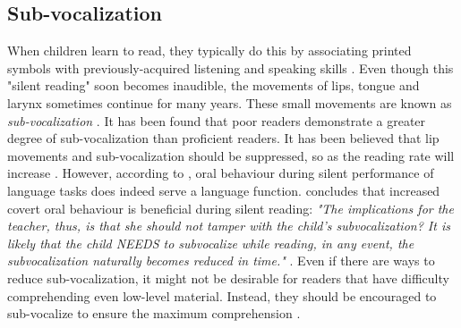 \subsection{Sub-vocalization}
When children learn to read, they typically do this by associating printed symbols with previously-acquired listening and speaking skills \cite{bruinsma_should_1980}. Even though this "silent reading" soon becomes inaudible, the movements of lips, tongue and larynx sometimes continue for many years. These small movements are known as \textit{sub-vocalization} \cite{bruinsma_should_1980}. It has been found that poor readers demonstrate a greater degree of sub-vocalization than proficient readers. It has been believed that lip movements and sub-vocalization should be suppressed, so as the reading rate will increase \cite{bruinsma_should_1980}. However, according to , oral behaviour during silent performance of language tasks does indeed serve a language function. \citeauthor{j_covert_1970} concludes that increased covert oral behaviour is beneficial during silent reading: \emph{"The implications for the teacher, thus, is that she should not tamper with the child's subvocalization? It is likely that the child NEEDS to subvocalize while reading, in any event, the subvocalization naturally becomes reduced in time."} \cite{bruinsma_should_1980}. Even if there are ways to reduce sub-vocalization, it might not be desirable for readers that have difficulty comprehending even low-level material. Instead, they should be encouraged to sub-vocalize to ensure the maximum comprehension \cite{bruinsma_should_1980}.

